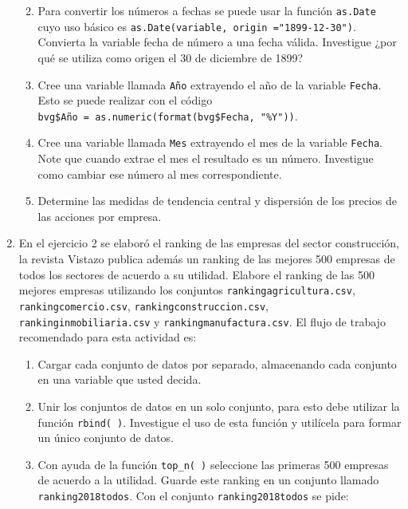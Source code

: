 \documentclass[letterpaper,]{book}
\providecommand{\tightlist}{%
  \setlength{\itemsep}{0pt}\setlength{\parskip}{0pt}}
\begin{document}
\begin{enumerate}
  \begin{enumerate}
  \def\labelenumii{\alph{enumii}.}
  \tightlist
  \item
    Para convertir los números a fechas se puede usar la función \texttt{as.Date} cuyo uso básico es \texttt{as.Date(variable,\ origin\ ="1899-12-30")}. Convierta la variable fecha de número a una fecha válida. Investigue ¿por qué se utiliza como origen el 30 de diciembre de 1899?
  \item
    Cree una variable llamada \texttt{Año} extrayendo el año de la variable \texttt{Fecha}. Esto se puede realizar con el código \texttt{bvg\$Año\ =\ as.numeric(format(bvg\$Fecha,\ "\%Y"))}.
  \item
    Cree una variable llamada \texttt{Mes} extrayendo el mes de la variable \texttt{Fecha}. Note que cuando extrae el mes el resultado es un número. Investigue como cambiar ese número al mes correspondiente.
  \item
    Determine las medidas de tendencia central y dispersión de los precios de las acciones por empresa.
  \end{enumerate}
\item
  En el ejercicio 2 se elaboró el ranking de las empresas del sector construcción, la revista Vistazo publica además un ranking de las mejores 500 empresas de todos los sectores de acuerdo a su utilidad. Elabore el ranking de las 500 mejores empresas utilizando los conjuntos \texttt{rankingagricultura.csv}, \texttt{rankingcomercio.csv}, \texttt{rankingconstruccion.csv}, \texttt{rankinginmobiliaria.csv} y \texttt{rankingmanufactura.csv}. El flujo de trabajo recomendado para esta actividad es:

  \begin{enumerate}
  \def\labelenumii{\alph{enumii}.}
  \tightlist
  \item
    Cargar cada conjunto de datos por separado, almacenando cada conjunto en una variable que usted decida.
  \item
    Unir los conjuntos de datos en un solo conjunto, para esto debe utilizar la función \texttt{rbind(\ )}. Investigue el uso de esta función y utilícela para formar un único conjunto de datos.
  \item
    Con ayuda de la función \texttt{top\_n(\ )} seleccione las primeras 500 empresas de acuerdo a la utilidad. Guarde este ranking en un conjunto llamado \texttt{ranking2018todos}. Con el conjunto \texttt{ranking2018todos} se pide:


\end{enumerate}
\end{enumerate}
\end{document}
